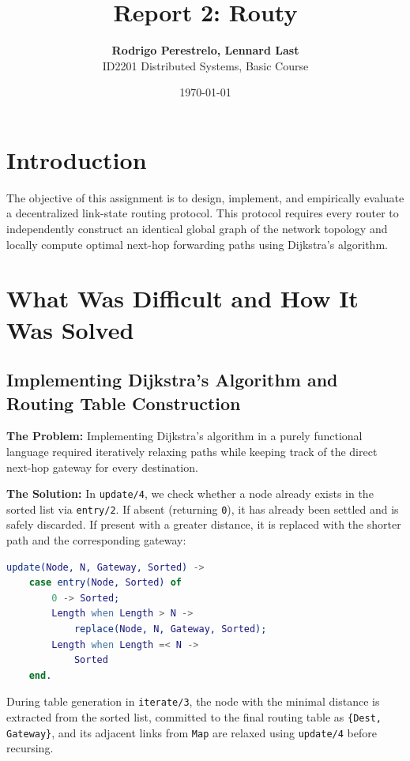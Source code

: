 \documentclass[a4paper, 11pt]{article}
\title{\textbf{Report 2: Routy}}
\author{\textbf{Rodrigo Perestrelo, Lennard Last} \\ ID2201 Distributed Systems, Basic Course}
\date{\today{}}
\begin{document}
\maketitle

\section{Introduction}

The objective of this assignment is to design, implement, and empirically evaluate a decentralized link-state routing protocol. This protocol requires every router to independently construct an identical global graph of the network topology and locally compute optimal next-hop forwarding paths using Dijkstra's algorithm.

\section{What Was Difficult and How It Was Solved}

\subsection{Implementing Dijkstra's Algorithm and Routing Table Construction}
\textbf{The Problem:} Implementing Dijkstra's algorithm in a purely functional language required iteratively relaxing paths while keeping track of the direct next-hop gateway for every destination.

\textbf{The Solution:} In \texttt{update/4}, we check whether a node already exists in the sorted list via \texttt{entry/2}. If absent (returning \texttt{0}), it has already been settled and is safely discarded. If present with a greater distance, it is replaced with the shorter path and the corresponding gateway:

\begin{lstlisting}[language=erlang]
update(Node, N, Gateway, Sorted) ->
    case entry(Node, Sorted) of
        0 -> Sorted;
        Length when Length > N ->
            replace(Node, N, Gateway, Sorted);
        Length when Length =< N ->
            Sorted
    end.
\end{lstlisting}

\noindent During table generation in \texttt{iterate/3}, the node with the minimal distance is extracted from the sorted list, committed to the final routing table as \texttt{\{Dest, Gateway\}}, and its adjacent links from \texttt{Map} are relaxed using \texttt{update/4} before recursing.
\end{document}
